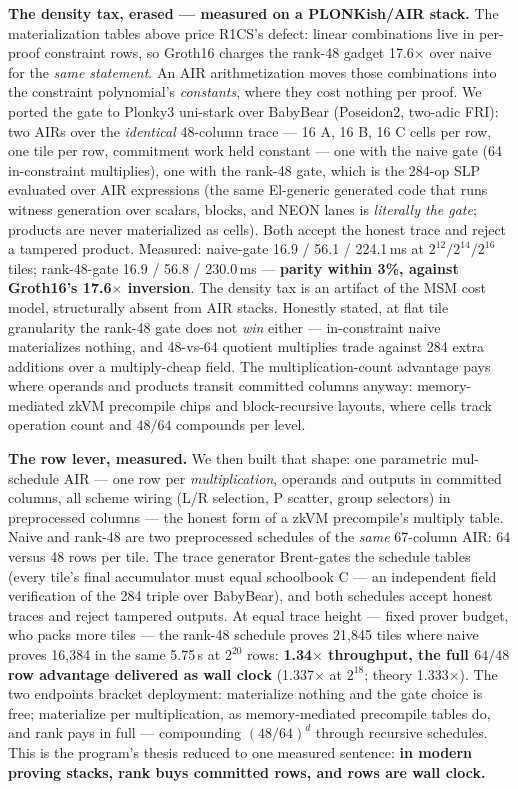 \documentclass[10pt]{article}
\begin{document}
\textbf{The density tax, erased --- measured on a PLONKish/AIR
stack.} The materialization tables above price R1CS's defect:
linear combinations live in per-proof constraint rows, so Groth16
charges the rank-48 gadget 17.6$\times$ over naive for the
\emph{same statement}. An AIR arithmetization moves those
combinations into the constraint polynomial's \emph{constants},
where they cost nothing per proof. We ported the gate to Plonky3
uni-stark over BabyBear (Poseidon2, two-adic FRI): two AIRs over
the \emph{identical} 48-column trace --- 16 A, 16 B, 16 C cells
per row, one tile per row, commitment work held constant --- one
with the naive gate (64 in-constraint multiplies), one with the
rank-48 gate, which is the 284-op SLP evaluated over AIR
expressions (the same El-generic generated code that runs witness
generation over scalars, blocks, and NEON lanes is \emph{literally
the gate}; products are never materialized as cells). Both accept
the honest trace and reject a tampered product. Measured:
naive-gate 16.9 / 56.1 / 224.1\,ms at $2^{12}/2^{14}/2^{16}$
tiles; rank-48-gate 16.9 / 56.8 / 230.0\,ms --- \textbf{parity
within 3\%, against Groth16's 17.6$\times$ inversion}. The
density tax is an artifact of the MSM cost model, structurally
absent from AIR stacks. Honestly stated, at flat tile granularity
the rank-48 gate does not \emph{win} either --- in-constraint
naive materializes nothing, and 48-vs-64 quotient multiplies
trade against 284 extra additions over a multiply-cheap field.
The multiplication-count advantage pays where operands and
products transit committed columns anyway: memory-mediated zkVM
precompile chips and block-recursive layouts, where cells track
operation count and $48/64$ compounds per level.

\textbf{The row lever, measured.} We then built that shape: one
parametric mul-schedule AIR --- one row per \emph{multiplication},
operands and outputs in committed columns, all scheme wiring (L/R
selection, P scatter, group selectors) in preprocessed columns ---
the honest form of a zkVM precompile's multiply table. Naive and
rank-48 are two preprocessed schedules of the \emph{same}
67-column AIR: 64 versus 48 rows per tile. The trace generator
Brent-gates the schedule tables (every tile's final accumulator
must equal schoolbook C --- an independent field verification of
the 284 triple over BabyBear), and both schedules accept honest
traces and reject tampered outputs. At equal trace height ---
fixed prover budget, who packs more tiles --- the rank-48 schedule
proves 21{,}845 tiles where naive proves 16{,}384 in the same
5.75\,s at $2^{20}$ rows: \textbf{1.34$\times$ throughput, the
full $64/48$ row advantage delivered as wall clock}
(1.337$\times$ at $2^{18}$; theory 1.333$\times$). The two
endpoints bracket deployment: materialize nothing and the gate
choice is free; materialize per multiplication, as memory-mediated
precompile tables do, and rank pays in full --- compounding
$(48/64)^d$ through recursive schedules. This is the program's
thesis reduced to one measured sentence: \textbf{in modern proving
stacks, rank buys committed rows, and rows are wall clock.}
\end{document}
